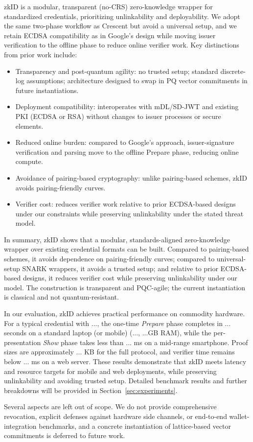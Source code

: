 zkID is a modular, transparent (no-CRS) zero-knowledge wrapper for standardized credentials, prioritizing unlinkability and deployability. We adopt the same two-phase workflow as Crescent but avoid a universal setup, and we retain ECDSA compatibility as in Google’s design while moving issuer verification to the offline phase to reduce online verifier work. Key distinctions from prior work include:
\begin{itemize}
  \item Transparency and post-quantum agility: no trusted setup; standard discrete-log assumptions; architecture designed to swap in PQ vector commitments in future instantiations.
  \item Deployment compatibility: interoperates with mDL/SD-JWT and existing PKI (ECDSA or RSA) without changes to issuer processes or secure elements.
  \item Reduced online burden: compared to Google’s approach, issuer-signature verification and parsing move to the offline Prepare phase, reducing online compute.
  \item Avoidance of pairing-based cryptography: unlike pairing-based schemes, zkID avoids pairing-friendly curves.
  \item Verifier cost: reduces verifier work relative to prior ECDSA-based designs under our constraints while preserving unlinkability under the stated threat model.
\end{itemize}

In summary, zkID shows that a modular, standards-aligned zero-knowledge wrapper over existing credential formats can be built. Compared to pairing-based schemes, it avoids dependence on pairing-friendly curves; compared to universal-setup SNARK wrappers, it avoids a trusted setup; and relative to prior ECDSA-based designs, it reduces verifier cost while preserving unlinkability under our model. The construction is transparent and PQC-agile; the current instantiation is classical and not quantum-resistant.

In our evaluation, zkID achieves practical performance on commodity hardware. For a typical credential with ..., the one-time \emph{Prepare} phase completes in ... seconds on a standard laptop (or mobile) (..., ...GB RAM), while the per-presentation \emph{Show} phase takes less than ... ms on a mid-range smartphone. Proof sizes are approximately ... KB for the full protocol, and verifier time remains below ... ms on a web server. These results demonstrate that zkID meets latency and resource targets for mobile and web deployments, while preserving unlinkability and avoiding trusted setup. Detailed benchmark results and further breakdowns will be provided in Section~\ref{sec:experiments}.

Several aspects are left out of scope. We do not provide comprehensive revocation, explicit defenses against hardware side channels, or end-to-end wallet-integration benchmarks, and a concrete instantiation of lattice-based vector commitments is deferred to future work.